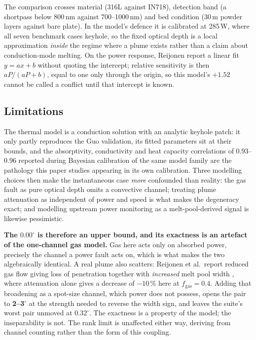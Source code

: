 \documentclass[final,5p,times,twocolumn]{elsarticle}
\begin{document}
The comparison crosses material (316L against IN718), detection band (a
shortpass below 800\,nm against 700--1000\,nm) and bed condition
(30\,\textmu m powder layers against bare plate). In the model's defence it is
calibrated at 285\,W, where all seven benchmark cases keyhole, so the fixed
optical depth is a local approximation \emph{inside} the regime where a plume
exists rather than a claim about conduction-mode melting. On the power response,
Reijonen report a linear fit $y=ax+b$ without quoting the intercept; relative
sensitivity is then $aP/(aP+b)$, equal to one only through the origin, so this
model's $+1.52$ cannot be called a conflict until that intercept is known.

\subsection{Limitations}
\label{sec:limits}

The thermal model is a conduction solution with an analytic keyhole patch: it
only partly reproduces the Guo validation, its fitted parameters sit at their bounds, and
the absorptivity, conductivity and heat capacity correlations of 0.93--0.96
reported during Bayesian calibration of the same model family \cite{Hon2021} are
the pathology this paper studies appearing in its own calibration. Three
modelling choices then make the instantaneous case \emph{more} confounded than
reality: the gas fault as pure optical depth omits a convective channel; treating
plume attenuation as independent of power and speed is what makes the degeneracy
exact; and modelling upstream power monitoring as a melt-pool-derived signal is
likewise pessimistic.

\textbf{The $0.00^\circ$ is therefore an upper bound, and its exactness is an
artefact of the one-channel gas model.} Gas here acts only on absorbed power,
precisely the channel a power fault acts on, which is what makes the two
algebraically identical. A real plume also scatters: Reijonen et al.\ report
reduced gas flow giving loss of penetration together with \emph{increased} melt
pool width \cite{Reijonen2020}, where attenuation alone gives a decrease of
$-10$\,\% here at $f_{\mathrm{gas}}=0.4$. Adding that broadening as a spot-size
channel, which power does not possess, opens the pair to \textbf{2--3$^\circ$}
at the strength needed to reverse the width sign, and leaves the suite's worst
pair unmoved at $0.32^\circ$. The exactness is a property of the model; the
inseparability is not. The rank limit is unaffected either way, deriving from
channel counting rather than the form of this coupling.
\end{document}
